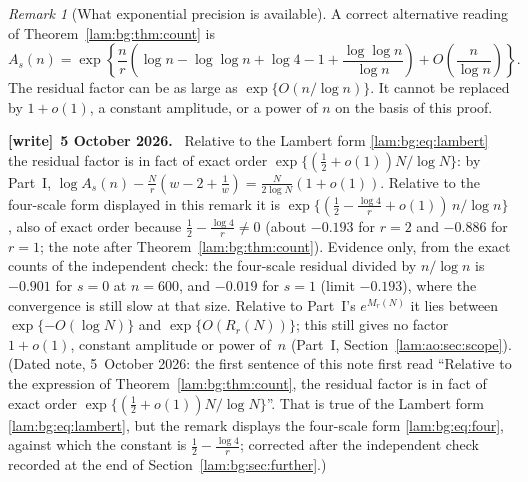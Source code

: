 \documentclass[11pt,a4paper]{article}
\numberwithin{equation}{section}
\theoremstyle{remark}
\newtheorem{remark}[theorem]{Remark}
\newenvironment{writenote}[1][]{\par\smallskip\begingroup\small
 \noindent\textbf{[write]}\if\relax\detokenize{#1}\relax\else~\textbf{#1.}\fi\ }%
 {\par\endgroup\smallskip}
\begin{document}
\begin{remark}[What exponential precision is available]
A correct alternative reading of Theorem~\ref{lam:bg:thm:count} is
\[
 A_s(n)=\exp\!\left\{\frac nr\left(\log n-\log\log n+\log4-1
             +\frac{\log\log n}{\log n}\right)
                    +O\!\left(\frac n{\log n}\right)\right\}.
\]
The residual factor can be as large as $\exp\{O(n/\log n)\}$. It cannot be replaced by $1+o(1)$, a constant amplitude, or a power of $n$ on the basis of this proof.
\end{remark}
\begin{writenote}[5 October 2026]
Relative to the Lambert form \eqref{lam:bg:eq:lambert} the residual factor is in fact of exact order $\exp\{(\frac12+o(1))N/\log N\}$: by Part~I, $\log A_s(n)-\frac Nr(w-2+\frac1w)=\frac N{2\log N}(1+o(1))$. Relative to the four-scale form displayed in this remark it is $\exp\{(\frac12-\frac{\log4}r+o(1))\,n/\log n\}$, also of exact order because $\frac12-\frac{\log4}r\ne0$ (about $-0.193$ for $r=2$ and $-0.886$ for $r=1$; the note after Theorem~\ref{lam:bg:thm:count}). Evidence only, from the exact counts of the independent check: the four-scale residual divided by $n/\log n$ is $-0.901$ for $s=0$ at $n=600$, and $-0.019$ for $s=1$ (limit $-0.193$), where the convergence is still slow at that size. Relative to Part~I's $e^{M_r(N)}$ it lies between $\exp\{-O(\log N)\}$ and $\exp\{O(R_r(N))\}$; this still gives no factor $1+o(1)$, constant amplitude or power of~$n$ (Part~I, Section~\ref{lam:ao:sec:scope}). (Dated note, 5~October 2026: the first sentence of this note first read ``Relative to the expression of Theorem~\ref{lam:bg:thm:count}, the residual factor is in fact of exact order $\exp\{(\frac12+o(1))N/\log N\}$''. That is true of the Lambert form \eqref{lam:bg:eq:lambert}, but the remark displays the four-scale form \eqref{lam:bg:eq:four}, against which the constant is $\frac12-\frac{\log4}r$; corrected after the independent check recorded at the end of Section~\ref{lam:bg:sec:further}.)
\end{writenote}
\end{document}
